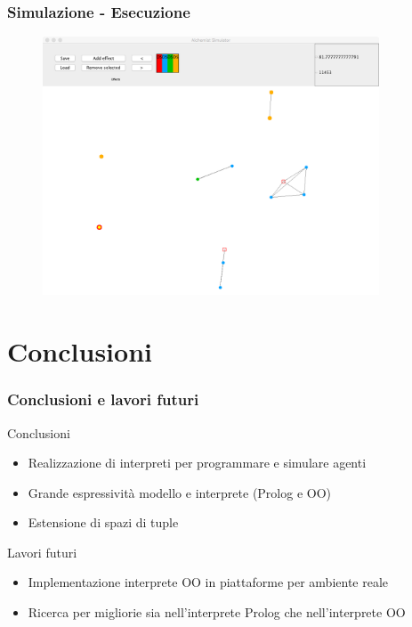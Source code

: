 \documentclass[handout]{beamer}\mode<presentation>{\usetheme{AMSCesenaBleu}}
\begin{document}

\begin{frame}
\frametitle{Simulazione - Esecuzione}
\vspace*{-0.25cm}
\begin{figure}
\includegraphics[width=10cm]{images/simul_harvest2.png}
\end{figure}
\end{frame}


\section{Conclusioni}

\begin{frame}
\frametitle{Conclusioni e lavori futuri}
\begin{block}{Conclusioni}
\begin{itemize}
\item Realizzazione di interpreti per programmare e simulare agenti
\item Grande espressività modello e interprete (Prolog e OO)
\item Estensione di spazi di tuple 
\end{itemize}
\end{block}
\begin{block}{Lavori futuri}
\begin{itemize}
\item Implementazione interprete OO in piattaforme per ambiente reale
\item Ricerca per migliorie sia nell'interprete Prolog che nell'interprete OO
\end{itemize}
\end{block}
\end{frame}

\section{}
\subsection{}
\maketitle
\end{document}
